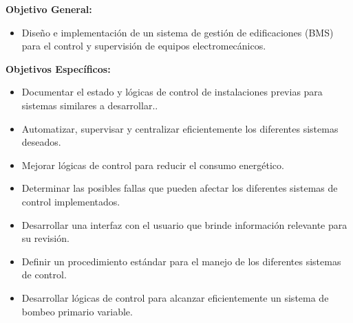 \textbf{Objetivo General:}

\begin{itemize}
    \item Diseño e implementación de un sistema de gestión de edificaciones (BMS) para el control y supervisión de equipos electromecánicos.
\end{itemize}

\textbf{Objetivos Específicos:}

\begin{itemize}
    \item Documentar el estado y lógicas de control de instalaciones previas para sistemas similares a desarrollar..
    \item Automatizar, supervisar y centralizar eficientemente los diferentes sistemas deseados.
    \item Mejorar lógicas de control para reducir el consumo energético. 
    \item Determinar las posibles fallas que pueden afectar los diferentes sistemas de control implementados.
    \item Desarrollar una interfaz con el usuario que brinde información relevante para su revisión.
    \item Definir un procedimiento estándar para el manejo de los diferentes sistemas de control.
    \item Desarrollar lógicas de control para alcanzar eficientemente un sistema de bombeo primario variable. 
\end{itemize}
